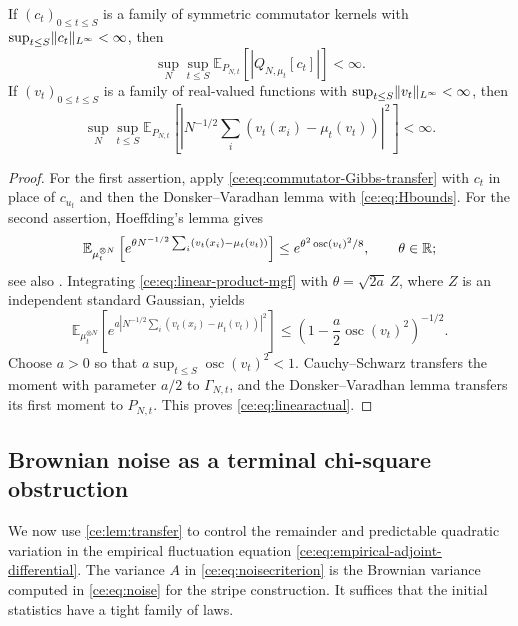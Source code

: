 \documentclass[11pt,reqno]{amsart}
\numberwithin{equation}{section}
\theoremstyle{plain}
\theoremstyle{remark}
\DeclarePairedDelimiter{\norm}{\lVert}{\rVert}
\newcommand{\E}{\mathbb E}\newcommand{\Q}{\mathbb Q}\newcommand{\Pb}{\mathbb P}
\begin{document}
\begin{lemma}\label{ce:lem:transfer}
If $(c_t)_{0\le t\le S}$ is a family of symmetric commutator kernels with $\sup_{t\le S}\norm{c_t}_{L^\infty}<\infty$, then
\begin{equation}\label{ce:eq:Qactual}
 \sup_N\sup_{t\le S}\E_{P_{N,t}}[|Q_{N,\mu_t}[c_t]|]<\infty.
\end{equation}
If $(v_t)_{0\le t\le S}$ is a family of real-valued functions with $\sup_{t\le S}\norm{v_t}_{L^\infty}<\infty$, then
\begin{equation}\label{ce:eq:linearactual}
 \sup_N\sup_{t\le S}
 \E_{P_{N,t}}\!\left[\left|N^{-1/2}\sum_i(v_t(x_i)-\mu_t(v_t))\right|^2\right]<\infty.
\end{equation}
\end{lemma}
\begin{proof}
For the first assertion, apply \eqref{ce:eq:commutator-Gibbs-transfer} with $c_t$ in place of $c_{u_t}$ and then the Donsker--Varadhan lemma with \eqref{ce:eq:Hbounds}. For the second assertion, Hoeffding's lemma gives
\begin{equation}\label{ce:eq:linear-product-mgf}
 \E_{\mu_t^{\otimes N}}\left[e^{\theta N^{-1/2}\sum_i(v_t(x_i)-\mu_t(v_t))}\right]
 \le e^{\theta^2\operatorname{osc}(v_t)^2/8},\qquad\theta\in\R;
\end{equation}
see also \cite[Section~8.2]{DGRpartition}. Integrating \eqref{ce:eq:linear-product-mgf} with $\theta=\sqrt{2a}\,Z$, where $Z$ is an independent standard Gaussian, yields
\begin{equation}\label{ce:eq:linear-product-square-mgf}
 \E_{\mu_t^{\otimes N}}\left[e^{a|N^{-1/2}\sum_i(v_t(x_i)-\mu_t(v_t))|^2}\right]
 \le\left(1-\frac a2\operatorname{osc}(v_t)^2\right)^{-1/2}.
\end{equation}
Choose $a>0$ so that $a\sup_{t\le S}\operatorname{osc}(v_t)^2<1$. Cauchy--Schwarz transfers the moment with parameter $a/2$ to $\Gamma_{N,t}$, and the Donsker--Varadhan lemma transfers its first moment to $P_{N,t}$. This proves \eqref{ce:eq:linearactual}.
\end{proof}

\subsection{Brownian noise as a terminal chi-square obstruction}\label{ce:sec:obstruction}

We now use \cref{ce:lem:transfer} to control the remainder and predictable quadratic variation in the empirical fluctuation equation \eqref{ce:eq:empirical-adjoint-differential}. The variance $A$ in \eqref{ce:eq:noisecriterion} is the Brownian variance computed in \eqref{ce:eq:noise} for the stripe construction. It suffices that the initial statistics have a tight family of laws.
\end{document}
